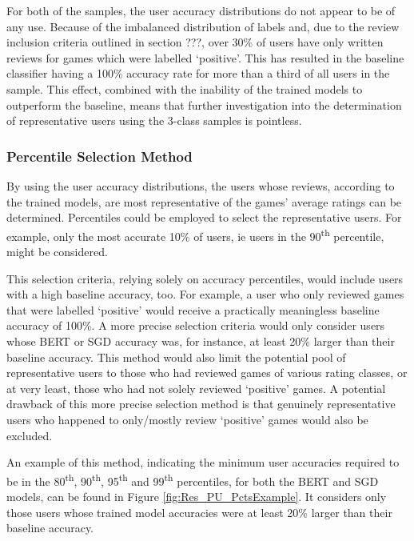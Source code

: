 For both of the samples, the user accuracy distributions do not appear to be of any use. Because of the imbalanced distribution of labels and, due to the review inclusion criteria outlined in section ???, over 30\% of users have only written reviews for games which were labelled `positive'. This has resulted in the baseline classifier having a 100\% accuracy rate for more than a third of all users in the sample. This effect, combined with the inability of the trained models to outperform the baseline, means that further investigation into the determination of representative users using the 3-class samples is pointless.

\subsubsection{Percentile Selection Method}

By using the user accuracy distributions, the users whose reviews, according to the trained models, are most representative of the games' average ratings can be determined. Percentiles could be employed to select the representative users. For example, only the most accurate 10\% of users, ie users in the 90\textsuperscript{th} percentile, might be considered.

This selection criteria, relying solely on accuracy percentiles, would include users with a high baseline accuracy, too. For example, a user who only reviewed games that were labelled `positive' would receive a practically meaningless baseline accuracy of 100\%. A more precise selection criteria would only consider users whose BERT or SGD accuracy was, for instance, at least 20\% larger than their baseline accuracy. This method would also limit the potential pool of representative users to those who had reviewed games of various rating classes, or at very least, those who had not solely reviewed `positive' games. A potential drawback of this more precise selection method is that genuinely representative users who happened to only/mostly review `positive' games would also be excluded.

An example of this method, indicating the minimum user accuracies required to be in the 80\textsuperscript{th}, 90\textsuperscript{th}, 95\textsuperscript{th} and 99\textsuperscript{th} percentiles, for both the BERT and SGD models, can be found in Figure \ref{fig:Res_PU_PctsExample}. It considers only those users whose trained model accuracies were at least 20\% larger than their baseline accuracy.

